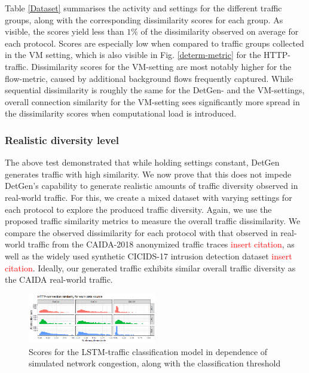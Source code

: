 \documentclass[sigconf]{acmart}
\begin{document}
Table \ref{Dataset} summarises the activity and settings for the different traffic groups, along with the corresponding dissimilarity scores for each group. As visible, the scores yield less than $1\%$ of the dissimilarity observed on average for each protocol. Scores are especially low when compared to traffic groups collected in the VM setting, which is also visible in Fig. \ref{determ-metric} for the HTTP-traffic. Dissimilarity scores for the VM-setting are most notably higher for the flow-metric, caused by additional background flows frequently captured. While sequential dissimilarity is roughly the same for the DetGen- and the VM-settings, overall connection similarity for the VM-setting sees significantly more spread in the dissimilarity scores when computational load is introduced.







\subsubsection{Realistic diversity level}

The above test demonstrated that while holding settings constant, DetGen generates traffic with high similarity. We now prove that this does not impede DetGen's capability to generate realistic amounts of traffic diversity observed in real-world traffic. For this, we create a mixed dataset with varying settings for each protocol to explore the produced traffic diversity. Again, we use the proposed traffic similarity metrics to measure the overall traffic dissimilarity. 
We compare the observed dissimilarity for each protocol with that observed in real-world traffic from the CAIDA-2018 anonymized traffic traces \textcolor{red}{insert citation}, as well as the widely used synthetic CICIDS-17 intrusion detection dataset \textcolor{red}{insert citation}. Ideally, our generated traffic exhibits similar overall traffic diversity as the CAIDA real-world traffic.



\begin{figure}
\centering
\includegraphics[width=0.5\textwidth]{images/HTTP_similarity.png}
\caption{Scores for the LSTM-traffic classification model in dependence of simulated network congestion, along with the classification threshold}\label{fig:diversity_exp}
\end{figure}
\end{document}
